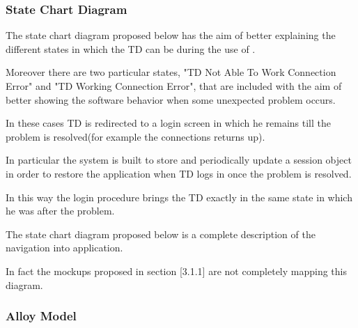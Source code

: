 \subsubsection{State Chart Diagram}
\begin{itemize}
\par The state chart diagram proposed below has the aim of better explaining the different states in which the TD can be during the use of \myTaxiService{}. \par
Moreover there are two particular states, "TD Not Able To Work Connection Error" and "TD Working Connection Error", that are included with the aim of better showing the software behavior when some unexpected problem occurs. \par
In these cases TD is redirected to a login screen in which he remains till the problem is resolved(for example the connections returns up).\par 
In particular the system is built to store and periodically update a session object in order to restore the application when TD logs in once the problem is resolved. \par 
In this way the login procedure  brings the TD exactly in the same state in which he was after the problem.
\par The state chart diagram proposed below is a complete description of the navigation into \myTaxiService{} application. \par In fact the mockups proposed in section [3.1.1] are not completely mapping this diagram.
\end{itemize}
\newpage
\subsubsection{Alloy Model}
\begin{itemize}
	\newpage
	\newpage
	\newpage
	\newpage
	\newpage
	\newpage
	\newpage
\end{itemize}
